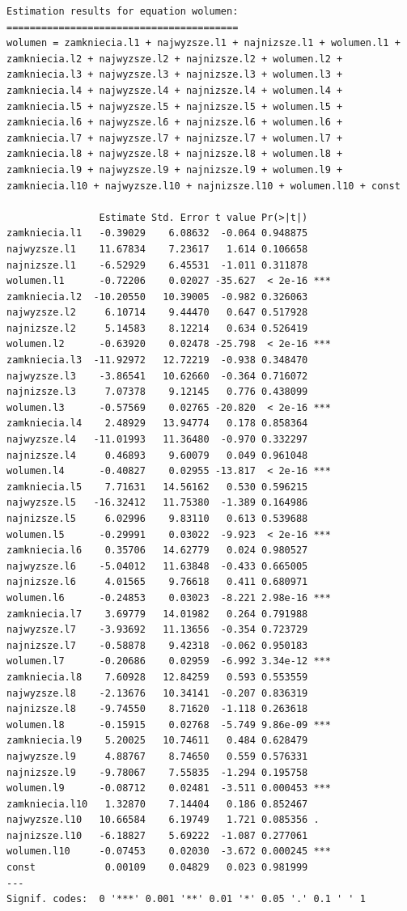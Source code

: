 \documentclass[
  polish,
  letterpaper,
  DIV=11,
  numbers=noendperiod]{scrartcl}
\begin{document}
\begin{verbatim}
Estimation results for equation wolumen: 
======================================== 
wolumen = zamkniecia.l1 + najwyzsze.l1 + najnizsze.l1 + wolumen.l1 + zamkniecia.l2 + najwyzsze.l2 + najnizsze.l2 + wolumen.l2 + zamkniecia.l3 + najwyzsze.l3 + najnizsze.l3 + wolumen.l3 + zamkniecia.l4 + najwyzsze.l4 + najnizsze.l4 + wolumen.l4 + zamkniecia.l5 + najwyzsze.l5 + najnizsze.l5 + wolumen.l5 + zamkniecia.l6 + najwyzsze.l6 + najnizsze.l6 + wolumen.l6 + zamkniecia.l7 + najwyzsze.l7 + najnizsze.l7 + wolumen.l7 + zamkniecia.l8 + najwyzsze.l8 + najnizsze.l8 + wolumen.l8 + zamkniecia.l9 + najwyzsze.l9 + najnizsze.l9 + wolumen.l9 + zamkniecia.l10 + najwyzsze.l10 + najnizsze.l10 + wolumen.l10 + const 

                Estimate Std. Error t value Pr(>|t|)    
zamkniecia.l1   -0.39029    6.08632  -0.064 0.948875    
najwyzsze.l1    11.67834    7.23617   1.614 0.106658    
najnizsze.l1    -6.52929    6.45531  -1.011 0.311878    
wolumen.l1      -0.72206    0.02027 -35.627  < 2e-16 ***
zamkniecia.l2  -10.20550   10.39005  -0.982 0.326063    
najwyzsze.l2     6.10714    9.44470   0.647 0.517928    
najnizsze.l2     5.14583    8.12214   0.634 0.526419    
wolumen.l2      -0.63920    0.02478 -25.798  < 2e-16 ***
zamkniecia.l3  -11.92972   12.72219  -0.938 0.348470    
najwyzsze.l3    -3.86541   10.62660  -0.364 0.716072    
najnizsze.l3     7.07378    9.12145   0.776 0.438099    
wolumen.l3      -0.57569    0.02765 -20.820  < 2e-16 ***
zamkniecia.l4    2.48929   13.94774   0.178 0.858364    
najwyzsze.l4   -11.01993   11.36480  -0.970 0.332297    
najnizsze.l4     0.46893    9.60079   0.049 0.961048    
wolumen.l4      -0.40827    0.02955 -13.817  < 2e-16 ***
zamkniecia.l5    7.71631   14.56162   0.530 0.596215    
najwyzsze.l5   -16.32412   11.75380  -1.389 0.164986    
najnizsze.l5     6.02996    9.83110   0.613 0.539688    
wolumen.l5      -0.29991    0.03022  -9.923  < 2e-16 ***
zamkniecia.l6    0.35706   14.62779   0.024 0.980527    
najwyzsze.l6    -5.04012   11.63848  -0.433 0.665005    
najnizsze.l6     4.01565    9.76618   0.411 0.680971    
wolumen.l6      -0.24853    0.03023  -8.221 2.98e-16 ***
zamkniecia.l7    3.69779   14.01982   0.264 0.791988    
najwyzsze.l7    -3.93692   11.13656  -0.354 0.723729    
najnizsze.l7    -0.58878    9.42318  -0.062 0.950183    
wolumen.l7      -0.20686    0.02959  -6.992 3.34e-12 ***
zamkniecia.l8    7.60928   12.84259   0.593 0.553559    
najwyzsze.l8    -2.13676   10.34141  -0.207 0.836319    
najnizsze.l8    -9.74550    8.71620  -1.118 0.263618    
wolumen.l8      -0.15915    0.02768  -5.749 9.86e-09 ***
zamkniecia.l9    5.20025   10.74611   0.484 0.628479    
najwyzsze.l9     4.88767    8.74650   0.559 0.576331    
najnizsze.l9    -9.78067    7.55835  -1.294 0.195758    
wolumen.l9      -0.08712    0.02481  -3.511 0.000453 ***
zamkniecia.l10   1.32870    7.14404   0.186 0.852467    
najwyzsze.l10   10.66584    6.19749   1.721 0.085356 .  
najnizsze.l10   -6.18827    5.69222  -1.087 0.277061    
wolumen.l10     -0.07453    0.02030  -3.672 0.000245 ***
const            0.00109    0.04829   0.023 0.981999    
---
Signif. codes:  0 '***' 0.001 '**' 0.01 '*' 0.05 '.' 0.1 ' ' 1



\end{verbatim}
\end{document}
